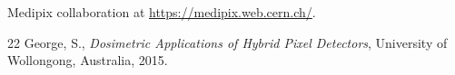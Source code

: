 \begin{thebibliography}{9}
  Medipix collaboration at \url{https://medipix.web.cern.ch/}.
  
 22
  George, S., \textit{Dosimetric Applications of Hybrid Pixel Detectors}, University of Wollongong, Australia, 2015.





  

 





\end{thebibliography}
